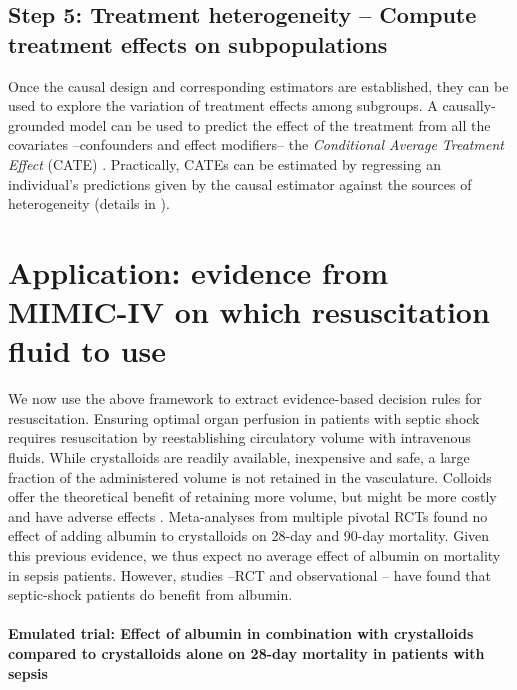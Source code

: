 \documentclass[10pt,letterpaper]{article}
\begin{document}
\subsection*{Step 5: Treatment heterogeneity -- Compute treatment effects on subpopulations}\label{sec:treatment_heterogeneity}

Once the causal design and corresponding estimators are established, they can be
used to explore the variation of treatment effects among subgroups. A
causally-grounded model can be used to predict the effect of the treatment from
all the covariates --confounders and effect modifiers-- the \emph{Conditional Average
  Treatment Effect} (CATE) \cite{robertson2021assessing}. Practically, CATEs can be estimated by regressing
an individual's predictions given by the causal estimator against the sources of
heterogeneity (details in ).


\section*{Application: evidence from MIMIC-IV on which resuscitation fluid to use}%
\label{sec:application_on_mimic_iv}

We now use the above framework to extract evidence-based decision rules for
resuscitation. Ensuring optimal organ perfusion in patients with septic shock
requires resuscitation by reestablishing circulatory volume with intravenous
fluids. While crystalloids are readily available, inexpensive and safe, a
large fraction of the administered volume is not retained in the vasculature.
Colloids offer the theoretical benefit of retaining more volume, but might be
more costly and have adverse effects \cite{annane2013effects}. Meta-analyses
from multiple pivotal RCTs found no effect of adding albumin to crystalloids
\cite{xu2014comparison,li2020resuscitation} on 28-day and 90-day mortality.  Given this
previous evidence, we thus expect no average effect of albumin on mortality in
sepsis patients. However, studies --RCT \cite{caironi2014albumin}  and observational
\cite{zhou2021early}-- have
found that septic-shock patients do benefit from albumin.

\paragraph{Emulated trial: Effect of albumin in combination with crystalloids
  compared to crystalloids alone on 28-day mortality in patients with sepsis}\label{emulated_trial}
\end{document}
